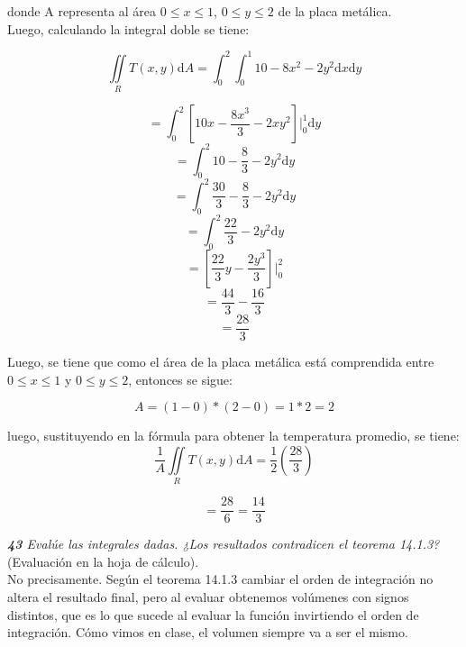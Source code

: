 \documentclass[a4paper,12pt]{article}
\begin{document}
	donde A representa al área $ 0 \leq x \leq 1$, $ 0 \leq y \leq 2 $ de la
	placa metálica.\\

	Luego, calculando la integral doble se tiene:

		$$ \iint\limits_{R} T(x,y)\mathrm{d}A  =
			\int_{0}^{2} \int_{0}^{1} 10 - 8x^2 - 2y^2 \mathrm{d}x \mathrm{d}y   $$

		$$ = \int_{0}^{2} [ 10x - \frac{8x^3}{3} - 2xy^2 ] \Big|_0^1 \mathrm{d}y $$
		$$ = \int_{0}^{2} 10 - \frac{8}{3} - 2y^2  \mathrm{d}y $$
		$$ = \int_{0}^{2} \frac{30}{3} - \frac{8}{3} - 2y^2 \mathrm{d}y $$
		$$ = \int_{0}^{2} \frac{22}{3} - 2y^2 \mathrm{d}y $$
		$$ = [ \frac{22}{3}y - \frac{2y^3}{3} ] \Big|_0^2$$
		$$ = \frac{44}{3} - \frac{16}{3} $$
		$$ = \frac{28}{3} $$

	Luego, se tiene que como el área de la placa metálica está comprendida entre
	$ 0 \leq x \leq 1 $ y $ 0 \leq y \leq 2 $, entonces se sigue:

	 	$$ A = (1 - 0) * (2 - 0) = 1 * 2 = 2  $$

	luego, sustituyendo en la fórmula para obtener la temperatura promedio, se
	tiene:
		$$ \frac{1}{A}  \iint\limits_{R} T(x,y)\mathrm{d}A  = \frac{1}{2} (\frac{28}{3}) $$

$$ = \frac{28}{6} = \frac{14}{3} $$

\textit{\textbf{43} Evalúe las integrales dadas. ¿Los resultados contradicen el teorema 14.1.3?}\\
(Evaluación en la hoja de cálculo).\\
No precisamente. Según el teorema 14.1.3 cambiar el orden de integración no altera el resultado final, pero al evaluar obtenemos volúmenes con signos distintos, que es lo que sucede al evaluar la función invirtiendo el orden de integración. Cómo vimos en clase, el volumen siempre va a ser el mismo.
\end{document}
